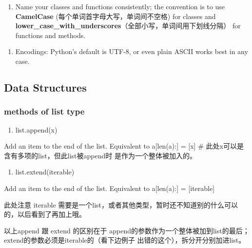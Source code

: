 \documentclass[11pt]{article}
\providecommand{\tightlist}{%
      \setlength{\itemsep}{0pt}\setlength{\parskip}{0pt}}
\begin{document}
    \begin{enumerate}
\def\labelenumi{\arabic{enumi}.}
\setcounter{enumi}{6}
\tightlist
\item
  Name your classes and functions consistently; the convention is to use
  \textbf{CamelCase} (每个单词首字母大写，单词间不空格) for classes and
  \textbf{lower\_case\_with\_underscores}（全部小写，单词间用下划线分隔）
  for functions and methods.
\end{enumerate}

    \begin{enumerate}
\def\labelenumi{\arabic{enumi}.}
\setcounter{enumi}{7}
\tightlist
\item
  Encodings: Python's default is UTF-8, or even plain ASCII works best
  in any case.
\end{enumerate}

    \subsection{Data Structures}\label{data-structures}

    \subsubsection{methods of list type}\label{methods-of-list-type}

    \begin{enumerate}
\def\labelenumi{\arabic{enumi}.}
\tightlist
\item
  list.append(x)
\end{enumerate}

Add an item to the end of the list. Equivalent to a{[}len(a):{]} =
{[}x{]} \# 此处x可以是含有多项的list，但此list被append时
是作为一个整体被加入的。

    \begin{enumerate}
\def\labelenumi{\arabic{enumi}.}
\setcounter{enumi}{1}
\tightlist
\item
  list.extend(iterable)
\end{enumerate}

Add an item to the end of the list. Equivalent to a{[}len(a):{]} =
{[}iterable{]}

此处注意 iterable
需要是一个list，或者其他类型，暂时还不知道别的什么可以的，以后看到了再加上哦。

    以上append 跟 extend 的区别在于
append的参数作为一个整体被加到list的最后；extend的参数必须是iterable的（看下边例子
出错的这个），拆分开分别加进list。
\end{document}
